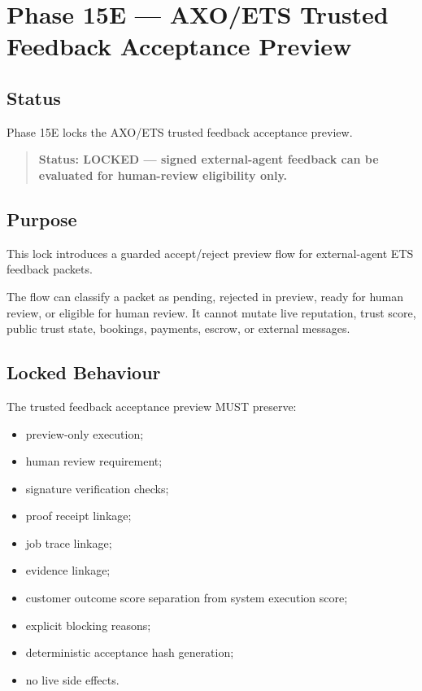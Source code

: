 \section{Phase 15E --- AXO/ETS Trusted Feedback Acceptance Preview}
\label{sec:phase15e-trusted-feedback-acceptance-preview}

\subsection{Status}

Phase 15E locks the AXO/ETS trusted feedback acceptance preview.

\begin{quote}
\textbf{Status: LOCKED --- signed external-agent feedback can be evaluated for human-review eligibility only.}
\end{quote}

\subsection{Purpose}

This lock introduces a guarded accept/reject preview flow for external-agent ETS feedback packets.

The flow can classify a packet as pending, rejected in preview, ready for human review, or eligible for human review. It cannot mutate live reputation, trust score, public trust state, bookings, payments, escrow, or external messages.

\subsection{Locked Behaviour}

The trusted feedback acceptance preview MUST preserve:

\begin{itemize}
  \item preview-only execution;
  \item human review requirement;
  \item signature verification checks;
  \item proof receipt linkage;
  \item job trace linkage;
  \item evidence linkage;
  \item customer outcome score separation from system execution score;
  \item explicit blocking reasons;
  \item deterministic acceptance hash generation;
  \item no live side effects.
\end{itemize}

